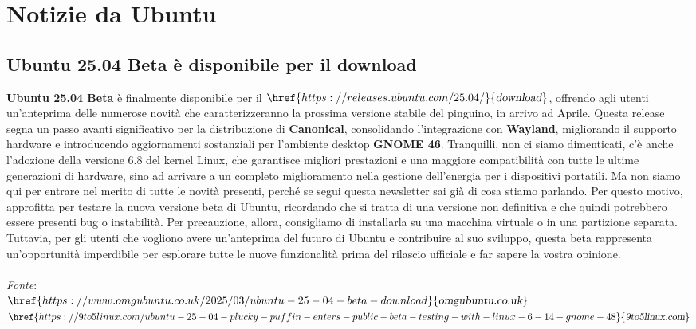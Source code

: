 \documentclass[a4paper,twoside]{article}
\begin{document}
\section{Notizie da Ubuntu}

\subsection{Ubuntu 25.04 Beta è disponibile per il download}
\textbf{Ubuntu 25.04 Beta} è finalmente disponibile per il $\href{https://releases.ubuntu.com/25.04/}{\textsl{download}}$, offrendo agli utenti un'anteprima delle numerose novità che caratterizzeranno la prossima versione stabile del pinguino, in arrivo ad Aprile. Questa release segna un passo avanti significativo per la distribuzione di \textbf{Canonical}, consolidando l'integrazione con \textbf{Wayland}, migliorando il supporto hardware e introducendo aggiornamenti sostanziali per l'ambiente desktop \textbf{GNOME 46}. Tranquilli, non ci siamo dimenticati, c'è anche l'adozione della versione 6.8 del kernel Linux, che garantisce migliori prestazioni e una maggiore compatibilità con tutte le ultime generazioni di hardware, sino ad arrivare a un completo miglioramento nella gestione dell'energia per i dispositivi portatili. Ma non siamo qui per entrare nel merito di tutte le novità presenti, perché se segui questa newsletter sai già di cosa stiamo parlando. Per questo motivo, approfitta per testare la nuova versione beta di Ubuntu, ricordando che si tratta di una versione non definitiva e che quindi potrebbero essere presenti bug o instabilità. Per precauzione, allora, consigliamo di installarla su una macchina virtuale o in una partizione separata. Tuttavia, per gli utenti che vogliono avere un'anteprima del futuro di Ubuntu e contribuire al suo sviluppo, questa beta rappresenta un'opportunità imperdibile per esplorare tutte le nuove funzionalità prima del rilascio ufficiale e far sapere la vostra opinione.\\
\\
\textit{Fonte}:\\
$\href{https://www.omgubuntu.co.uk/2025/03/ubuntu-25-04-beta-download}{\textsl{omgubuntu.co.uk}}$\\
$\href{https://9to5linux.com/ubuntu-25-04-plucky-puffin-enters-public-beta-testing-with-linux-6-14-gnome-48}{\textsl{9to5linux.com}}$
\end{document}
